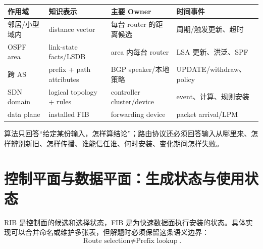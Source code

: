 \documentclass[11pt,a4paper]{ctexart}
\begin{document}
\begin{center}
\small
\begin{tabularx}{\linewidth}{L{2.0cm}L{3.0cm}L{3.0cm}Y}
\toprule
作用域 & 知识表示 & 主要 Owner & 时间事件\\
\midrule
邻居/小型域内 & distance vector & 每台 router 的距离候选 & 周期/触发更新、超时\\
OSPF area & link-state facts/LSDB & area 内每台 router & LSA 更新、洪泛、SPF\\
跨 AS & prefix + path attributes & BGP speaker/本地策略 & UPDATE/withdraw、policy\\
SDN domain & logical topology + rules & controller cluster/device & event、计算、规则安装\\
data plane & installed FIB & forwarding device & packet arrival/LPM\\
\bottomrule
\end{tabularx}
\end{center}

算法只回答“给定某份输入，怎样算结论”；路由协议还必须回答输入从哪里来、怎样辨别新旧、怎样传播、谁能信任谁、何时安装、变化期间怎样失败。

\section{控制平面与数据平面：生成状态与使用状态}

\begin{center}
\end{center}

RIB 是控制面的候选和选择状态，FIB 是为快速数据面执行安装的状态。具体实现可以合并命名或维护多张表，但解题时必须保留这条语义边界：
\[
\boxed{\text{Route selection}\ne\text{Prefix lookup}}.
\]
\end{document}
